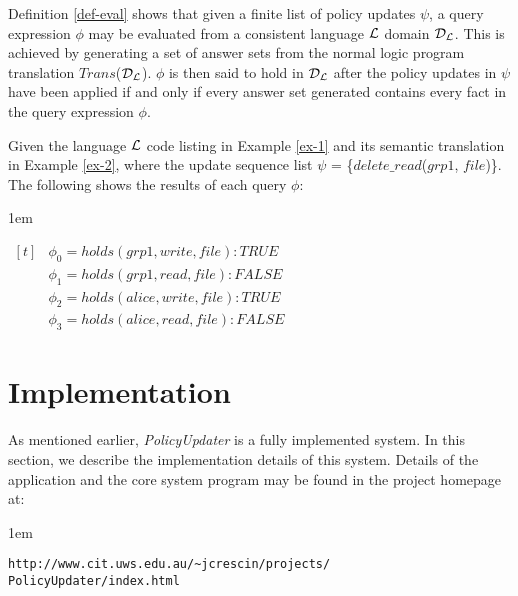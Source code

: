 \documentclass[global,twocolumn,final]{svjour}
\newenvironment{vexample}
  {\begin{example}\hspace{0.25em}}
  {\end{example}}
\newenvironment{vquote}
  {\begin{list}{}{\leftmargin 1em}\item[]}
  {\end{list}}
\begin{document}
    Definition \ref{def-eval} shows that given a finite list of policy updates
    $\psi$, a query expression $\phi$ may be evaluated from a consistent
    language ${\cal L}$ domain ${\cal D_{L}}$. This is achieved by generating a
    set of answer sets from the normal logic program translation
    $Trans$(${\cal D_{L}}$). $\phi$ is then said to hold in ${\cal D_{L}}$
    after the policy updates in $\psi$ have been applied if and only if every
    answer set generated contains every fact in the query expression $\phi$.

    \begin{vexample}
      \label{ex-3}
      Given the language ${\cal L}$ code listing in Example \ref{ex-1} and its
      semantic translation in Example \ref{ex-2}, where the update sequence
      list $\psi$ = \{$delete\_read$($grp1$, $file$)\}. The following shows the
      results of each query $\phi$:

      \begin{vquote}
        \begin{math}
          \begin{aligned}[t]
            &\phi_{0} = holds(grp1, write, file) : TRUE \\
            &\phi_{1} = holds(grp1, read, file) : FALSE \\
            &\phi_{2} = holds(alice, write, file) : TRUE \\
            &\phi_{3} = holds(alice, read, file) : FALSE
          \end{aligned}
        \end{math}
      \end{vquote}
    \end{vexample}

  \section{Implementation}
    \label{sec-implement}

    As mentioned earlier, {\em PolicyUpdater} is a fully implemented system.
    In this section, we describe the implementation details of this system.
    Details of the application and the core system program may be found in
    the project homepage at:

    \begin{vquote}
      {\tt\scriptsize http://www.cit.uws.edu.au/\~{}jcrescin/projects/} \\
      {\tt\scriptsize PolicyUpdater/index.html}
    \end{vquote}
\end{document}
